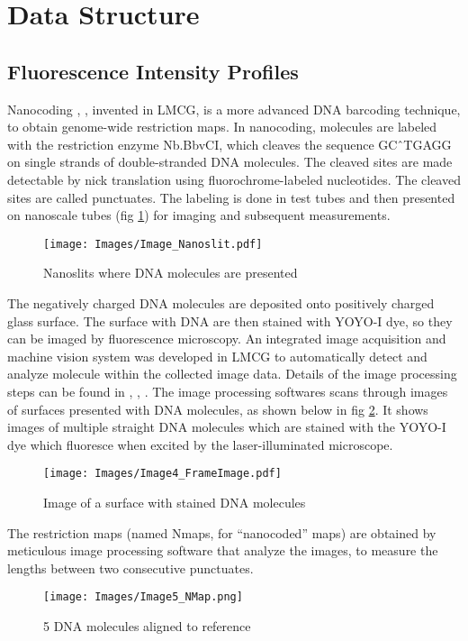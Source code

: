 \section{Data Structure} \label{Ch2}

\subsection{Fluorescence Intensity Profiles}
Nanocoding \cite{Jo_etal_2007_PNAS}, \cite{Jo_etal_2009}, invented in LMCG, is a more advanced DNA barcoding technique, to obtain genome-wide restriction maps. In nanocoding, molecules are labeled with the restriction enzyme Nb.BbvCI, which cleaves the sequence GC\^\ TGAGG on single strands of double-stranded DNA molecules. The cleaved sites are made detectable by nick translation using fluorochrome-labeled nucleotides. The cleaved sites are called punctuates. The labeling is done in test tubes and then presented on nanoscale tubes (fig \ref{fig:Fig2_NanoSlit}) for imaging and subsequent measurements. 
\begin{figure}[H]
\begin{center}
\texttt{[image: Images/Image\_Nanoslit.pdf]}
\end{center}
\caption{Nanoslits where DNA molecules are presented}
\label{fig:Fig2_NanoSlit}
\end{figure}
The negatively charged DNA molecules are deposited onto positively charged glass surface. The surface with DNA are then stained with YOYO-I dye, so they can be imaged by fluorescence microscopy. An integrated image acquisition and machine vision system was developed in LMCG to automatically detect and analyze molecule within the collected image data. Details of the image processing steps can be found in \cite{Dimalanta_etal_2004_AnalChem}, \cite{Jo_etal_2007_PNAS}, \cite{Ravindran_Gupta_2015_GigaScience}. The image processing softwares scans through images of surfaces presented with DNA molecules, as shown below in fig \ref{fig:Fig2_FrameImage}. It shows images of multiple straight DNA molecules which are stained with the YOYO-I dye which fluoresce when excited by the laser-illuminated microscope.  
\begin{figure}[H]
\begin{center}
\texttt{[image: Images/Image4\_FrameImage.pdf]}
\end{center}
\caption{Image of a surface with stained DNA molecules}
\label{fig:Fig2_FrameImage}
\end{figure}
The restriction maps (named Nmaps, for ``nanocoded'' maps) are obtained by meticulous image processing software that analyze the images, to measure the lengths between two consecutive punctuates. 
\begin{figure}[H]
\begin{center}
\texttt{[image: Images/Image5\_NMap.png]}
\end{center}
\caption{5 DNA molecules aligned to reference}
\label{fig:Fig2_NMap}
\end{figure}


